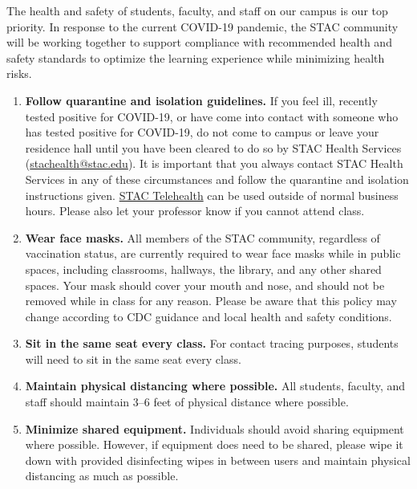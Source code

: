 \documentclass[11pt,letterpaper]{article}
\begin{document}

The health and safety of students, faculty, and staff on our campus is our top priority. In response to the current COVID-19 pandemic, the STAC community will be working together to support compliance with recommended health and safety standards to optimize the learning experience while minimizing health risks. 

\begin{enumerate}[1.]
\item {\bfseries Follow quarantine and isolation guidelines.} If you feel ill, recently tested positive for COVID-19, or have come into contact with someone who has tested positive for COVID-19, do not come to campus or leave your residence hall until you have been cleared to do so by STAC Health Services (\href{mailto:stachealth@stac.edu}{stachealth@stac.edu}). It is important that you always contact STAC Health Services in any of these circumstances and follow the quarantine and isolation instructions given. \href{https://timely.md/schools/index.html?school=stac\&}{STAC Telehealth} can be used outside of normal business hours. Please also let your professor know if you cannot attend class. 

\item {\bfseries Wear face masks.} All members of the STAC community, regardless of vaccination status, are currently required to wear face masks while in public spaces, including classrooms, hallways, the library, and any other shared spaces. Your mask should cover your mouth and nose, and should not be removed while in class for any reason. Please be aware that this policy may change according to CDC guidance and local health and safety conditions. 

\item {\bfseries Sit in the same seat every class.} For contact tracing purposes, students will need to sit in the same seat every class.

\item {\bfseries Maintain physical distancing where possible.} All students, faculty, and staff should maintain 3--6 feet of physical distance where possible. 

\item {\bfseries Minimize shared equipment.} Individuals should avoid sharing equipment where possible. However, if equipment does need to be shared, please wipe it down with provided disinfecting wipes in between users and maintain physical distancing as much as possible.


\end{enumerate}
\end{document}

